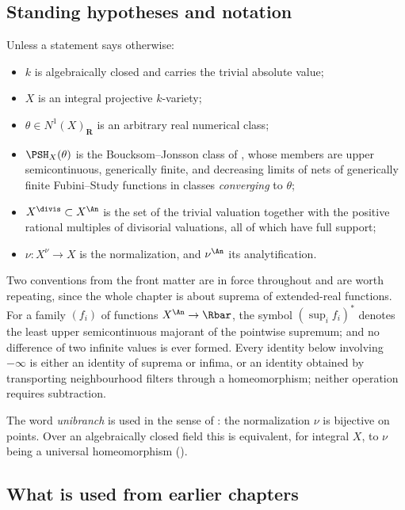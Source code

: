 \subsection{Standing hypotheses and notation}
\label{sec:ch45-hypotheses}

Unless a statement says otherwise:

\begin{itemize}
\item $k$ is algebraically closed and carries the trivial absolute value;
\item $X$ is an integral projective $k$-variety;
\item $\theta\in N^1(X)_{\mathbf R}$ is an arbitrary real numerical class;
\item $\PSH_X(\theta)$ is the Boucksom--Jonsson class of
      , whose members are upper semicontinuous, generically
      finite, and decreasing limits of nets of generically finite
      Fubini--Study functions in classes \emph{converging} to $\theta$;
\item $X^{\divis}\subset X^{\An}$ is the set of the trivial valuation
      together with the positive rational multiples of divisorial valuations,
      all of which have full support;
\item $\nu:X^\nu\to X$ is the normalization, and $\nu^{\An}$ its
      analytification.
\end{itemize}

Two conventions from the front matter are in force throughout and are worth
repeating, since the whole chapter is about suprema of extended-real
functions.  For a family $(f_i)$ of functions
$X^{\An}\to\Rbar$, the symbol $(\sup_i f_i)^*$ denotes the least upper
semicontinuous majorant of the pointwise supremum; and no difference of two
infinite values is ever formed.  Every identity below involving $-\infty$
is either an identity of suprema or infima, or an identity obtained by
transporting neighbourhood filters through a homeomorphism; neither
operation requires subtraction.

The word \emph{unibranch} is used in the sense of
: the normalization $\nu$ is bijective on points.
Over an algebraically closed field this is equivalent, for integral $X$,
to $\nu$ being a universal homeomorphism
().

\subsection{What is used from earlier chapters}
\label{sec:ch45-inputs}

